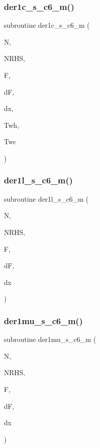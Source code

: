 \subsubsection{\texorpdfstring{der1c\+\_\+s\+\_\+c6\+\_\+m()}{der1c\_s\_c6\_m()}}
{\footnotesize\ttfamily subroutine der1c\+\_\+s\+\_\+c6\+\_\+m (\begin{DoxyParamCaption}\item[{integer}]{N,  }\item[{integer}]{N\+R\+HS,  }\item[{real, dimension(n,nrhs)}]{F,  }\item[{real, dimension(0\+:n,nrhs)}]{dF,  }\item[{real}]{dx,  }\item[{real}]{Twh,  }\item[{real}]{Twc }\end{DoxyParamCaption})}

\mbox{\label{ders__n_8f_aeb7bb2e484e12ecec556dd458b046759}} 
\subsubsection{\texorpdfstring{der1l\+\_\+s\+\_\+c6\+\_\+m()}{der1l\_s\_c6\_m()}}
{\footnotesize\ttfamily subroutine der1l\+\_\+s\+\_\+c6\+\_\+m (\begin{DoxyParamCaption}\item[{integer}]{N,  }\item[{integer}]{N\+R\+HS,  }\item[{real, dimension(n,nrhs)}]{F,  }\item[{real, dimension(0\+:n,nrhs)}]{dF,  }\item[{real}]{dx }\end{DoxyParamCaption})}

\mbox{\label{ders__n_8f_ade7d6a43f43b87a141098a663c9a944f}} 
\subsubsection{\texorpdfstring{der1mu\+\_\+s\+\_\+c6\+\_\+m()}{der1mu\_s\_c6\_m()}}
{\footnotesize\ttfamily subroutine der1mu\+\_\+s\+\_\+c6\+\_\+m (\begin{DoxyParamCaption}\item[{integer}]{N,  }\item[{integer}]{N\+R\+HS,  }\item[{real, dimension(n,nrhs)}]{F,  }\item[{real, dimension(0\+:n,nrhs)}]{dF,  }\item[{real}]{dx }\end{DoxyParamCaption})}

